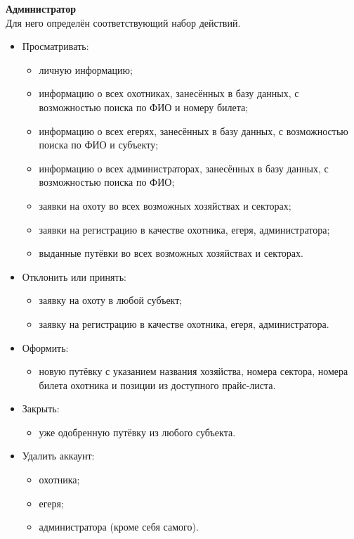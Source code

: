 		\textbf{Администратор}\\
		Для него определён соответствующий набор действий.
		\begin{itemize}
			\item Просматривать:
			\begin{itemize}
				\item личную информацию;
				\item информацию о всех охотниках, занесённых в базу данных, с возможностью поиска по ФИО и номеру билета;
				\item информацию о всех егерях, занесённых в базу данных, с возможностью поиска по ФИО и субъекту;
				\item информацию о всех администраторах, занесённых в базу данных, с возможностью поиска по ФИО;
				\item заявки на охоту во всех возможных хозяйствах и секторах;
				\item заявки на регистрацию в качестве охотника, егеря, администратора;
				\item выданные путёвки во всех возможных хозяйствах и секторах.
			\end{itemize}
			\item Отклонить или принять:
			\begin{itemize} 
				\item заявку на охоту в любой субъект;
				\item заявку на регистрацию в качестве охотника, егеря, администратора.
			\end{itemize}
			\item Оформить:
			\begin{itemize} 
				\item новую путёвку с указанием названия хозяйства, номера сектора, номера билета охотника и позиции из доступного прайс-листа.
			\end{itemize} 
			\item Закрыть:
			\begin{itemize}
				\item уже одобренную путёвку из любого субъекта.
			\end{itemize}
			\item Удалить аккаунт:
			\begin{itemize} 
				\item охотника;
				\item егеря;
				\item администратора (кроме себя самого).
			\end{itemize}
		\end{itemize}
	
